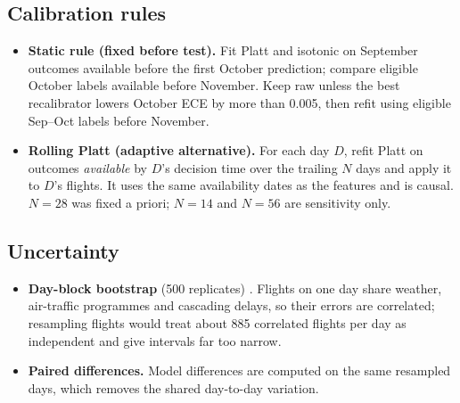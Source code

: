 \documentclass[conference]{IEEEtran}
\begin{document}
\subsection{Calibration rules}
\begin{itemize}
\item \textbf{Static rule (fixed before test).} Fit Platt and isotonic on September outcomes available before the first October prediction; compare eligible October labels available before November. Keep raw unless the best recalibrator lowers October ECE by more than 0.005, then refit using eligible Sep--Oct labels before November.
\item \textbf{Rolling Platt (adaptive alternative).} For each day $D$, refit Platt on outcomes \emph{available} by $D$'s decision time over the trailing $N$ days and apply it to $D$'s flights. It uses the same availability dates as the features and is causal. $N=28$ was fixed a priori; $N=14$ and $N=56$ are sensitivity only.
\end{itemize}

\subsection{Uncertainty}
\begin{itemize}
\item \textbf{Day-block bootstrap} (500 replicates) \cite{kunsch1989}. Flights on one day share weather, air-traffic programmes and cascading delays, so their errors are correlated; resampling flights would treat about 885 correlated flights per day as independent and give intervals far too narrow.
\item \textbf{Paired differences.} Model differences are computed on the same resampled days, which removes the shared day-to-day variation.
\end{itemize}
\end{document}
